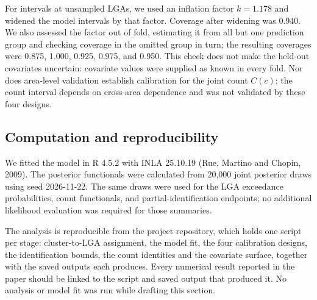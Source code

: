 For intervals at unsampled LGAs, we used an inflation factor \(k=1.178\) and widened the model intervals by that factor. Coverage after widening was 0.940. We also assessed the factor out of fold, estimating it from all but one prediction group and checking coverage in the omitted group in turn; the resulting coverages were 0.875, 1.000, 0.925, 0.975, and 0.950. This check does not make the held-out covariates uncertain: covariate values were supplied as known in every fold. Nor does area-level validation establish calibration for the joint count \(C(c)\); the count interval depends on cross-area dependence and was not validated by these four designs.



\subsection{Computation and reproducibility}

We fitted the model in R 4.5.2 with INLA 25.10.19 (Rue, Martino and Chopin, 2009). The posterior functionals were calculated from 20,000 joint posterior draws using seed 2026-11-22. The same draws were used for the LGA exceedance probabilities, count functionals, and partial-identification endpoints; no additional likelihood evaluation was required for those summaries.

The analysis is reproducible from the project repository, which holds one script per stage: cluster-to-LGA assignment, the model fit, the four calibration designs, the identification bounds, the count identities and the covariate surface, together with the saved outputs each produces. Every numerical result reported in the paper should be linked to the script and saved output that produced it. No analysis or model fit was run while drafting this section.
